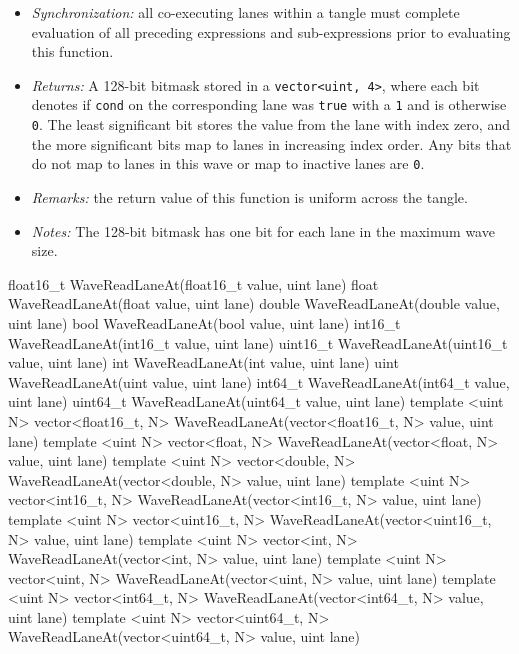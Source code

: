 \begin{itemize}
  \item \textit{Synchronization:} all co-executing \gls{lane}s within a \gls{tangle}
  must complete evaluation of all preceding expressions and sub-expressions
  prior to evaluating this function.
  \item \textit{Returns:} A 128-bit bitmask stored in a \texttt{vector<uint,
  4>}, where each bit denotes if \texttt{cond} on the corresponding \gls{lane}
  was \texttt{true} with a \texttt{1} and is otherwise \texttt{0}. The least
  significant bit stores the value from the \gls{lane} with index zero, and the
  more significant bits map to \gls{lane}s in increasing index order. Any bits
  that do not map to \gls{lane}s in this \gls{wave} or map to inactive
  \gls{lane}s are \texttt{0}.
  \item \textit{Remarks:} the return value of this function is uniform across
  the \gls{tangle}.
  \item \textit{Notes:} The 128-bit bitmask has one bit for each \gls{lane} in
  the maximum \gls{wave} size.
\end{itemize}

\begin{HLSL}
float16_t WaveReadLaneAt(float16_t value, uint lane)
float WaveReadLaneAt(float value, uint lane)
double WaveReadLaneAt(double value, uint lane)
bool WaveReadLaneAt(bool value, uint lane)
int16_t WaveReadLaneAt(int16_t value, uint lane)
uint16_t WaveReadLaneAt(uint16_t value, uint lane)
int WaveReadLaneAt(int value, uint lane)
uint WaveReadLaneAt(uint value, uint lane)
int64_t WaveReadLaneAt(int64_t value, uint lane)
uint64_t WaveReadLaneAt(uint64_t value, uint lane)
template <uint N> vector<float16_t, N> WaveReadLaneAt(vector<float16_t, N> value, uint lane)
template <uint N> vector<float, N> WaveReadLaneAt(vector<float, N> value, uint lane)
template <uint N> vector<double, N> WaveReadLaneAt(vector<double, N> value, uint lane)
template <uint N> vector<int16_t, N> WaveReadLaneAt(vector<int16_t, N> value, uint lane)
template <uint N> vector<uint16_t, N> WaveReadLaneAt(vector<uint16_t, N> value, uint lane)
template <uint N> vector<int, N> WaveReadLaneAt(vector<int, N> value, uint lane)
template <uint N> vector<uint, N> WaveReadLaneAt(vector<uint, N> value, uint lane)
template <uint N> vector<int64_t, N> WaveReadLaneAt(vector<int64_t, N> value, uint lane)
template <uint N> vector<uint64_t, N> WaveReadLaneAt(vector<uint64_t, N> value, uint lane)
\end{HLSL}

